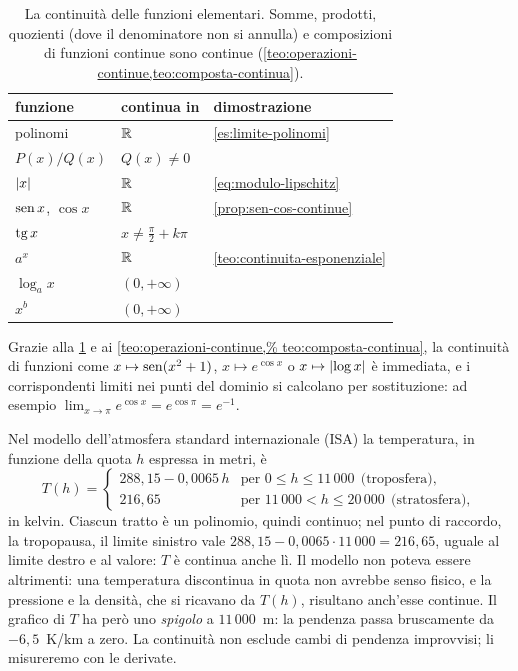 \begin{table}[htb]
\centering
\small
\renewcommand{\arraystretch}{1.3}
\begin{tabular}{l l l}
\toprule
funzione & continua in & dimostrazione\\
\midrule
polinomi & $\mathbb{R}$ & \cref{es:limite-polinomi}\\
$P(x)/Q(x)$ & $Q(x)\neq0$ & \\
$\lvert x\rvert$ & $\mathbb{R}$ & \eqref{eq:modulo-lipschitz}\\
$\operatorname{sen} x$, $\cos x$ & $\mathbb{R}$ & \cref{prop:sen-cos-continue}\\
$\operatorname{tg} x$ & $x\neq\frac\pi2+k\pi$ & \\
$a^{x}$ & $\mathbb{R}$ & \cref{teo:continuita-esponenziale}\\
$\log_{a}x$ & $(0,+\infty)$ & \\
$x^{b}$ & $(0,+\infty)$ & \\
\bottomrule
\end{tabular}
\caption{La continuità delle funzioni elementari. Somme, prodotti, quozienti (dove il
denominatore non si annulla) e composizioni di funzioni continue sono continue
(\cref{teo:operazioni-continue,teo:composta-continua}).}
\label{tab:elementari-continue}
\end{table}

Grazie alla \cref{tab:elementari-continue} e ai \cref{teo:operazioni-continue,%
teo:composta-continua}, la continuità di funzioni come
$x\mapsto\operatorname{sen}(x^{2}+1)$, $x\mapsto e^{\cos x}$ o $x\mapsto\lvert \log x\rvert$ è immediata, e i
corrispondenti limiti nei punti del dominio si calcolano per sostituzione: ad esempio
$\lim_{x\to\pi}e^{\cos x}=e^{\cos\pi}=e^{-1}$.

\begin{idea}
Nel modello dell'atmosfera standard internazionale (ISA) la temperatura, in funzione
della quota $h$ espressa in metri, è
\[
  T(h)=
  \begin{cases}
    288{,}15-0{,}0065\,h & \text{per } 0\le h\le11\,000 \ \ \text{(troposfera)},\\
    216{,}65 & \text{per } 11\,000<h\le20\,000 \ \ \text{(stratosfera)},
  \end{cases}
\]
in kelvin. Ciascun tratto è un polinomio, quindi continuo; nel punto di raccordo, la
tropopausa, il limite sinistro vale $288{,}15-0{,}0065\cdot11\,000=216{,}65$, uguale al
limite destro e al valore: $T$ è continua anche lì. Il modello non poteva essere
altrimenti: una temperatura discontinua in quota non avrebbe senso fisico, e la
pressione e la densità, che si ricavano da $T(h)$, risultano anch'esse continue. Il
grafico di $T$ ha però uno \emph{spigolo} a $11\,000$~m: la pendenza passa bruscamente da
$-6{,}5$~K/km a zero. La continuità non esclude cambi di pendenza improvvisi; li
misureremo con le derivate.
\end{idea}

